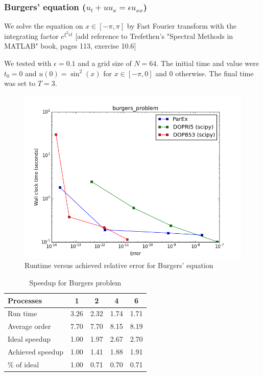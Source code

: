 \documentclass[12pt]{article}
\begin{document}
\subsubsection{Burgers' equation ($u_t+uu_x=\epsilon u_{xx}$)}
We solve the equation on $x \in [-\pi,\pi]$ by Fast Fourier transform with the integrating factor $e^{\xi^2 \epsilon t}$ [add reference to Trefethen's "Spectral Methods in MATLAB" book, pages 113, exercise 10.6]

We tested with $\epsilon = 0.1$ and a grid size of $N=64$. The initial time and value were $t_0=0$ and $u(0) = \sin^2(x)$ for $x \in [-\pi,0]$ and $0$ otherwise. The final time was set to $T = 3$.
\begin{figure}[h]
 \includegraphics[scale=0.5]{images/burgers_problem_err_vs_time.png}
\centering
\caption{Runtime versus achieved relative error for Burgers' equation}
\end{figure}


\begin{table}
\caption{Speedup for Burgers problem\label{tbl:Burgers}}{
\begin{tabular}{lcccc}\\
Processes & 1 & 2 & 4 & 6\\ \hline
Run time &  3.26 &  2.32 &  1.74 &  1.71 \\
Average order &  7.70 &  7.70 &  8.15 &  8.19 \\
Ideal speedup &  1.00 &  1.97 &  2.67 &  2.70 \\
Achieved speedup &  1.00 &  1.41 &  1.88 &  1.91 \\
\% of ideal &  1.00 &  0.71 &  0.70 &  0.71 \\ \hline
\end{tabular}}
\end{table}
\end{document}
